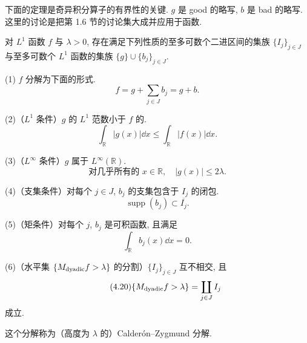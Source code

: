 下面的定理是奇异积分算子的有界性的关键. $g$ 是 good 的略写, $b$ 是 bad 的略写. 这里的讨论是把第 1.6 节的讨论集大成并应用于函数.

\begin{theorem}\label{thm:4.3}
对 $L^{1}$ 函数 $f$ 与 $\lambda > 0$, 存在满足下列性质的至多可数个二进区间的集族 $\{I_{j}\}_{j \in J}$ 与至多可数个 $L^{1}$ 函数的集族 $\{g\} \cup \{b_{j}\}_{j \in J}$.

(1) $f$ 分解为下面的形式.
\begin{equation}\tag{4.15}
f = g + \sum_{j \in J}b_{j} = g + b.
\label{eq:4.15}
\end{equation}

(2)（$L^{1}$ 条件）$g$ 的 $L^{1}$ 范数小于 $f$ 的.
\begin{equation}\tag{4.16}
\int_{\mathbb{R}}|g(x)|\dd x \leq \int_{\mathbb{R}}|f(x)|\dd x.
\label{eq:4.16}
\end{equation}

(3)（$L^{\infty}$ 条件）$g$ 属于 $L^{\infty}(\mathbb{R})$.
\begin{equation}\tag{4.17}
\text{对几乎所有的 } x \in \mathbb{R}, \quad |g(x)| \leq 2\lambda.
\label{eq:4.17}
\end{equation}

(4)（支集条件）对每个 $j \in J$, $b_{j}$ 的支集包含于 $I_{j}$ 的闭包.
\begin{equation}\tag{4.18}
\operatorname{supp}(b_{j}) \subset \overline{I_{j}}.
\label{eq:4.18}
\end{equation}

(5)（矩条件）对每个 $j$, $b_{j}$ 是可积函数, 且满足
\begin{equation}\tag{4.19}
\int_{\mathbb{R}}b_{j}(x)\dd x = 0.
\label{eq:4.19}
\end{equation}

(6)（水平集 $\{M_{\mathrm{dyadic}}f > \lambda\}$ 的分割）$\{I_{j}\}_{j \in J}$ 互不相交, 且
\begin{equation}\tag{4.20}
\{M_{\mathrm{dyadic}}f > \lambda\} = \coprod_{j \in J}I_{j}
\label{eq:4.20}
\end{equation}
成立.

这个分解称为（高度为 $\lambda$ 的）Calderón--Zygmund 分解.
\end{theorem}

